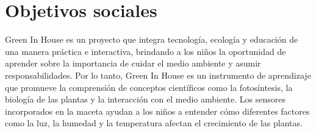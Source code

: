 
\section{Objetivos sociales}\label{objetivos-sociales}

Green In House es un proyecto que integra tecnología, ecología y educación de una manera práctica e interactiva, brindando a los niños la oportunidad de aprender sobre la importancia de cuidar el medio ambiente y asumir responsabilidades. Por lo tanto, Green In House es un instrumento de aprendizaje que promueve la comprensión de conceptos científicos como la fotosíntesis, la biología de las plantas y la interacción con el medio ambiente. Los sensores incorporados en la maceta ayudan a los niños a entender cómo diferentes factores como la luz, la humedad y la temperatura afectan el crecimiento de las plantas.


